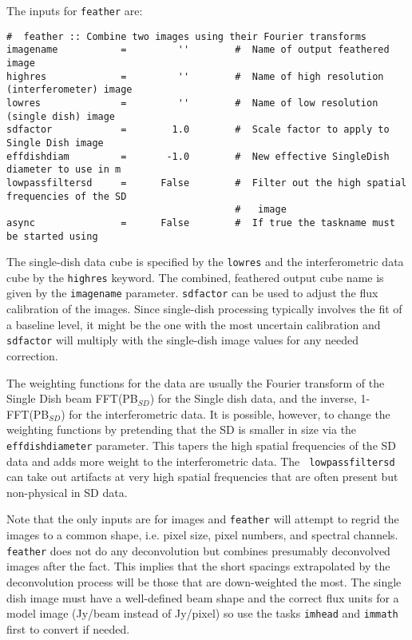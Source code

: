 The inputs for {\tt feather} are:
\small
\begin{verbatim}
#  feather :: Combine two images using their Fourier transforms
imagename           =         ''        #  Name of output feathered image
highres             =         ''        #  Name of high resolution (interferometer) image
lowres              =         ''        #  Name of low resolution (single dish) image
sdfactor            =        1.0        #  Scale factor to apply to Single Dish image
effdishdiam         =       -1.0        #  New effective SingleDish diameter to use in m
lowpassfiltersd     =      False        #  Filter out the high spatial frequencies of the SD
                                        #   image
async               =      False        #  If true the taskname must be started using
\end{verbatim}
\normalsize 


The single-dish data cube is specified by the {\tt lowres} and the
interferometric data cube by the {\tt highres} keyword. The combined,
feathered output cube name is given by the {\tt imagename}
parameter. {\tt sdfactor} can be used to adjust the flux calibration
of the images. Since single-dish processing typically involves the fit
of a baseline level, it might be the one with the most uncertain
calibration and {\tt sdfactor} will multiply with the single-dish
image values for any needed correction.


The weighting functions for the data are usually the Fourier transform
of the Single Dish beam FFT(PB$_{SD}$) for the Single dish data, and
the inverse, 1-FFT(PB$_{SD}$) for the interferometric data. It is
possible, however, to change the weighting functions by pretending
that the SD is smaller in size via the {\tt effdishdiameter}
parameter. This tapers the high spatial frequencies of the SD data and
adds more weight to the interferometric data. The {\tt
  lowpassfiltersd} can take out artifacts at very high spatial
frequencies that are often present but non-physical in SD data.


Note that the only inputs are for images and {\tt feather} will
attempt to regrid the images to a common shape, i.e. pixel size, pixel
numbers, and spectral channels. {\tt feather} does not do any
deconvolution but combines presumably deconvolved images after the
fact. This implies that the short spacings extrapolated by the
deconvolution process will be those that are down-weighted the
most. The single dish image must have a well-defined beam shape and
the correct flux units for a model image (Jy/beam instead of Jy/pixel)
so use the tasks {\tt imhead} and {\tt immath} first to convert if
needed.

